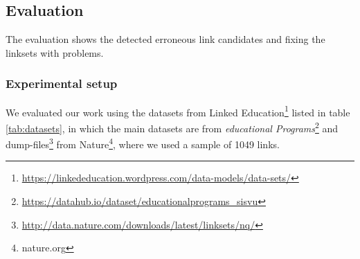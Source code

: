 \subsection{Evaluation} \label{evaluation}


The evaluation shows the detected erroneous link candidates and fixing the linksets with problems. 

\subsubsection{Experimental setup}

We evaluated our work using the datasets from Linked Education\footnote{\url{https://linkededucation.wordpress.com/data-models/data-sets/}} listed in table \ref{tab:datasets}, in which the main datasets are from \emph{educational Programs}\footnote{\url{https://datahub.io/dataset/educationalprograms_sisvu}} and dump-files\footnote{\url{http://data.nature.com/downloads/latest/linksets/nq/}} from Nature\footnote{nature.org}, where we used a sample of 1049 links.

\begin{table}[htb] 
\centering
\caption{Educational Datasets}
\label{tab:datasets}
\end{table}


